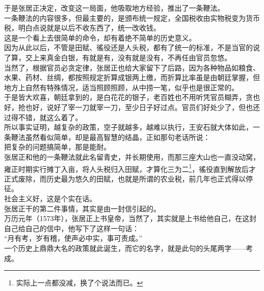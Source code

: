 \begin{multicols}{\theparacolNo}
于是张居正决定，改变这一局面，他吸取地方经验，推出了一条鞭法。\\

一条鞭法的内容很多，但最主要的，是颁布统一规定，全国税收由实物税变为货币税，明白点说就是以后不收东西了，统一改收钱。\\

这是一个看上去很简单的命令，却有着绝不简单的历史意义。\\

因为从此以后，不管是田赋、徭役还是人头税，都有了统一的标准，不是当官的说了算，交上来真金白银，有就是有，没有就是没有，不再任由官员忽悠。\\

当然了，根据官员必贪定律，张居正也给大家留下了后路，因为各种物品如粮食、水果、药材、丝绸，都按照规定折算成银两上缴，而折算比率虽是由朝廷掌握，但地方上自然有特殊情况，适当照顾照顾，从中捞一笔，似乎也是很正常的。\\

于是皆大欢喜，朝廷拿到的，是白花花的银子，老百姓也不用听凭官员糊弄，贪也好，抢也好，说好了宰一刀就宰一刀，至少日子好过点。官员们好处少了，但也还过得不错，就这么着了。\\

所以事实证明，越复杂的政策，空子就越多，越难以执行，王安石就大体如此，一条鞭法虽然看似简单，却是最高智慧的结晶，正如那句老话所说：\\

把复杂的问题搞简单，那是能耐。\\

张居正和他的一条鞭法就此名留青史，并长期使用，而那三座大山也一直没动窝，雍正时期实行摊丁入亩，将人头税归入田赋，才算化三为二\footnote{实际上一点都没减，换了个说法而已。}，徭役直到解放后才正式废除，而历史最为悠久的田赋，也就是所谓的农业税，前几年也正式得以停征。\\

社会主义好，这是个实在话。\\

张居正干的第二件事情，其实是由一封信引起的。\\

万历元年（1573年），张居正上书皇帝，当然了，其实就是上书给他自己，在这封自己给自己的信中，他写下了这样一句话：\\

“月有考，岁有稽，使声必中实，事可责成。”\\

一个历史上鼎鼎大名的政策就此诞生，而它的名字，就是此句的头尾两字——考成。\\


\end{multicols}
